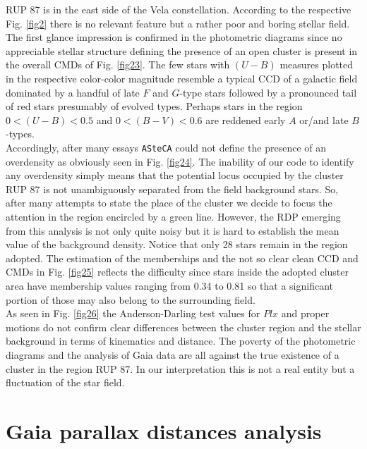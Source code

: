 \documentclass[draft]{aa}
\begin{document}
RUP 87 is in the east side of the Vela constellation. According to the
respective Fig. \ref{fig2} there is no relevant feature but a rather poor and
boring stellar field. The first glance impression is confirmed in the
photometric diagrams since no appreciable stellar structure
defining the presence of an open cluster is present in the overall CMDs of Fig.
\ref{fig23}. The few stars with $(U-B)$ measures plotted in the respective
color-color magnitude resemble a typical CCD of a galactic field dominated by a
handful of late $F$ and $G$-type stars followed by a pronounced tail of red
stars presumably of evolved types. Perhaps stars in the region $0<(U-B)<0.5$
and $0<(B-V)<0.6$ are reddened early $A$ or/and late $B$-types.\\

Accordingly, after many essays \texttt{ASteCA} could not define the presence of
an overdensity as obviously seen in Fig. \ref{fig24}. The inability of our code
to identify any overdensity simply means that the potential locus occupied by
the cluster RUP 87 is not unambiguously separated from the field background
stars. So, after many attempts to state the place of the cluster we decide to
focus the attention in the region encircled by a green line. However, the RDP
emerging from this analysis is not only quite noisy but it is hard to establish
the mean value of the background density. Notice that only 28 stars remain in
the region adopted. The estimation of the memberships and the not so clear clean
CCD and CMDs in Fig. \ref{fig25} reflects the difficulty since stars inside the
adopted cluster area have membership values ranging from 0.34 to 0.81 so that
a significant portion of those may also belong to the surrounding field.\\

As seen in Fig. \ref{fig26} the Anderson-Darling test values for $Plx$ and
proper motions do not confirm clear differences between the cluster region and
the stellar background in terms of kinematics and distance. The poverty of the
photometric diagrams and the analysis of Gaia data are all against the true
existence of a cluster in the region RUP 87. In our interpretation this is
not a real entity but a fluctuation of the star field.





\section{Gaia parallax distances analysis}
\label{sec:gaia_distances}
\end{document}
